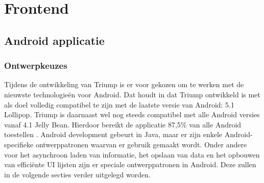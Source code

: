 \section{Frontend}
\subsection{Android applicatie}

\subsubsection{Ontwerpkeuzes}
Tijdens de ontwikkeling van Triump is er voor gekozen om te werken met de nieuwste technologieën voor Android. Dat houdt in dat Triump ontwikkeld is met als doel volledig compatibel te zijn met de laatste versie van Android: 5.1 Lollipop. Triump is daarnaast wel nog steeds compatibel met alle Android versies vanaf 4.1 Jelly Bean. Hierdoor bereikt de applicatie 87,5\% van alle Android toestellen \cite{market_share}. 
Android development gebeurt in Java, maar er zijn enkele Android-specifieke ontwerppatronen waarvan er gebruik gemaakt wordt. Onder andere voor het asynchroon laden van informatie, het opslaan van data en het opbouwen van efficiënte UI lijsten zijn er speciale ontwerppatronen in Android. Deze zullen in de volgende secties verder uitgelegd worden.

